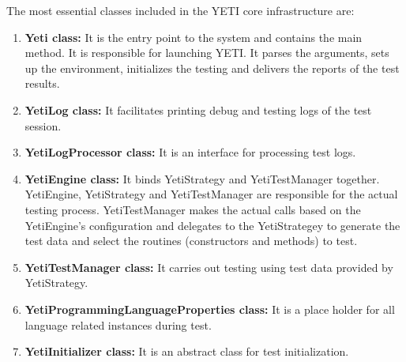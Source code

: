 The most essential classes included in the YETI core infrastructure are:
\begin{enumerate}
\item {\textbf{Yeti class:}} It is the entry point to the system and contains the main method. It is responsible for launching YETI. It parses the arguments, sets up the environment, initializes the testing and delivers the reports of the test results.
\item {\textbf{YetiLog class:}} It facilitates printing debug and testing logs of the test session. 
\item {\textbf{YetiLogProcessor class:}} It is an interface for processing test logs.
\item {\textbf{YetiEngine class:}} It binds YetiStrategy and YetiTestManager together. YetiEngine, YetiStrategy and YetiTestManager are responsible for the actual testing process. YetiTestManager makes the actual calls based on the YetiEngine’s configuration and delegates to the YetiStrategey to generate the test data and select the routines (constructors and methods) to test.
\item {\textbf{YetiTestManager class:}} It carries out testing using test data provided by YetiStrategy.
\item {\textbf{YetiProgrammingLanguageProperties class:}} It is a place holder for all language related instances during test.
\item {\textbf{YetiInitializer class:}} It is an abstract class for test initialization.
\end{enumerate}

